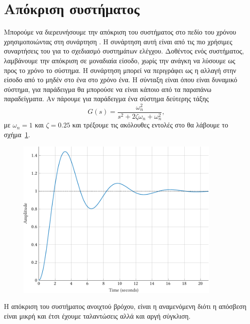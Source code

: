 \section{Απόκριση συστήματος}
Μπορούμε να διερευνήσουμε την απόκριση του συστήματος στο πεδίο του χρόνου
χρησιμοποιώντας στη συνάρτηση . Η συνάρτηση αυτή είναι από τις πιο
χρήσιμες συναρτήσεις του  για το σχεδιασμό συστημάτων ελέγχου.
Δοθέντος ενός συστήματος, λαμβάνουμε την απόκριση σε μοναδιαία είσοδο, χωρίς την
ανάγκη να λύσουμε ως προς το χρόνο το σύστημα. Η συνάρτηση  μπορεί να
περιγράφει ως η αλλαγή στην είσοδο από το μηδέν στο ένα στο χρόνο ένα. Η σύνταξη
είναι
όπου  είναι δυναμικό σύστημα, για παράδειγμα θα μπορούσε να είναι
κάποιο από τα παραπάνω παραδείγματα. Αν πάρουμε για παράδειγμα ένα σύστημα
δεύτερης τάξης
\[
    G(s) = \frac{\omega_n^2}{s^2 + 2\zeta\omega_n + \omega_n^2},
\]
με \( \omega_n = 1 \) και \( \zeta = 0.25 \) και τρέξουμε τις ακόλουθες εντολές
στο  θα λάβουμε το σχήμα~\ref{fig:prelim5}.
\eng{}
\begin{figure}[h!]
    \centering
    \includegraphics[width=0.9\textwidth]{figures/prelim5.pdf}
    \label{fig:prelim5}
\end{figure}
Η απόκριση του συστήματος ανοιχτού βρόχου, είναι η αναμενόμενη διότι η απόσβεση
είναι μικρή και έτσι έχουμε ταλαντώσεις αλλά και αργή σύγκλιση.


